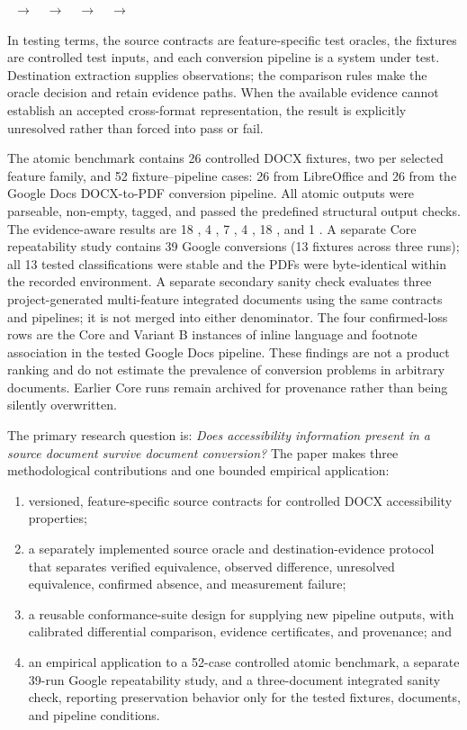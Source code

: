 \begin{center}
\ $\rightarrow$\ 
\ $\rightarrow$\ 
\ $\rightarrow$\ 
\ $\rightarrow$\ 
\end{center}

In testing terms, the source contracts are feature-specific test oracles, the fixtures are controlled test inputs, and each conversion pipeline is a system under test. Destination extraction supplies observations; the comparison rules make the oracle decision and retain evidence paths. When the available evidence cannot establish an accepted cross-format representation, the result is explicitly unresolved rather than forced into pass or fail.

The atomic benchmark contains 26 controlled DOCX fixtures, two per selected feature family, and 52 fixture--pipeline cases: 26 from LibreOffice and 26 from the Google Docs DOCX-to-PDF conversion pipeline. All atomic outputs were parseable, non-empty, tagged, and passed the predefined structural output checks. The evidence-aware results are 18 \verifiedpreserved{}, 4 \observedpartial{}, 7 \altered{}, 4 \confirmedlost{}, 18 \unresolved{}, and 1 \measured{}. A separate Core repeatability study contains 39 Google conversions (13 fixtures across three runs); all 13 tested classifications were stable and the PDFs were byte-identical within the recorded environment. A separate secondary sanity check evaluates three project-generated multi-feature integrated documents using the same contracts and pipelines; it is not merged into either denominator. The four confirmed-loss rows are the Core and Variant B instances of inline language and footnote association in the tested Google Docs pipeline. These findings are not a product ranking and do not estimate the prevalence of conversion problems in arbitrary documents. Earlier Core runs remain archived for provenance rather than being silently overwritten.

The primary research question is: \emph{Does accessibility information present in a source document survive document conversion?} The paper makes three methodological contributions and one bounded empirical application:

\begin{enumerate}
\item versioned, feature-specific source contracts for controlled DOCX accessibility properties;
\item a separately implemented source oracle and destination-evidence protocol that separates verified equivalence, observed difference, unresolved equivalence, confirmed absence, and measurement failure;
\item a reusable conformance-suite design for supplying new pipeline outputs, with calibrated differential comparison, evidence certificates, and provenance; and
\item an empirical application to a 52-case controlled atomic benchmark, a separate 39-run Google repeatability study, and a three-document integrated sanity check, reporting preservation behavior only for the tested fixtures, documents, and pipeline conditions.
\end{enumerate}

